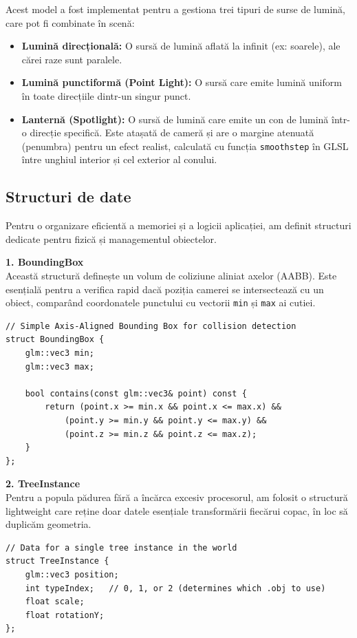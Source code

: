 \documentclass[11pt,a4paper]{article}
\begin{document}
Acest model a fost implementat pentru a gestiona trei tipuri de surse de lumină, care pot fi combinate în scenă:
\begin{itemize}
    \item \textbf{Lumină direcțională:} O sursă de lumină aflată la infinit (ex: soarele), ale cărei raze sunt paralele.
    \item \textbf{Lumină punctiformă (Point Light):} O sursă care emite lumină uniform în toate direcțiile dintr-un singur punct.
    \item \textbf{Lanternă (Spotlight):} O sursă de lumină care emite un con de lumină într-o direcție specifică. Este atașată de cameră și are o margine atenuată (penumbra) pentru un efect realist, calculată cu funcția \texttt{smoothstep} în GLSL între unghiul interior și cel exterior al conului.
\end{itemize}

\subsection{Structuri de date}
Pentru o organizare eficientă a memoriei și a logicii aplicației, am definit structuri dedicate pentru fizică și managementul obiectelor.

\textbf{1. BoundingBox} \\
Această structură definește un volum de coliziune aliniat axelor (AABB). Este esențială pentru a verifica rapid dacă poziția camerei se intersectează cu un obiect, comparând coordonatele punctului cu vectorii \texttt{min} și \texttt{max} ai cutiei. 

\begin{verbatim}
// Simple Axis-Aligned Bounding Box for collision detection
struct BoundingBox {
    glm::vec3 min;
    glm::vec3 max;

    bool contains(const glm::vec3& point) const {
        return (point.x >= min.x && point.x <= max.x) &&
            (point.y >= min.y && point.y <= max.y) &&
            (point.z >= min.z && point.z <= max.z);
    }
};
\end{verbatim}

\textbf{2. TreeInstance} \\
Pentru a popula pădurea fără a încărca excesiv procesorul, am folosit o structură lightweight care reține doar datele esențiale transformării fiecărui copac, în loc să duplicăm geometria.

\begin{verbatim}
// Data for a single tree instance in the world
struct TreeInstance {
    glm::vec3 position;
    int typeIndex;   // 0, 1, or 2 (determines which .obj to use)
    float scale;
    float rotationY; 
};
\end{verbatim}
\end{document}
